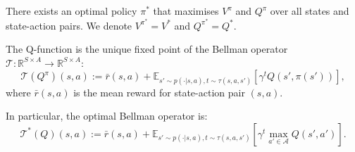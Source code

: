\documentclass{article}
\begin{document}
There exists an optimal policy $\pi^*$ that maximises $V^{\pi}$ and $Q^{\pi}$ over all states and state-action pairs. We denote $V^{\pi^*} = V^*$ and $Q^{\pi^*} = Q^*$.

The Q-function is the unique fixed point of the Bellman operator $\mathcal{T}: \mathbb{R}^{S \times A} \to \mathbb{R}^{S \times A}$:
$$\mathcal{T}(Q^{\pi})(s, a) := \bar r(s, a) + \mathbb{E}_{s' \sim p(\cdot | s, a), t \sim \tau(s, a, s')} \left[ \gamma^t Q(s', \pi(s')) \right],$$
where $\bar r(s, a)$ is the mean reward for state-action pair $(s, a)$.

In particular, the optimal Bellman operator is:
$$\mathcal{T^*}(Q)(s, a) := \bar r(s, a) + \mathbb{E}_{s' \sim p(\cdot | s, a), t \sim \tau(s, a, s')} \left[ \gamma^t \max_{a' \in \mathcal{A}} Q(s', a') \right].$$
\end{document}
